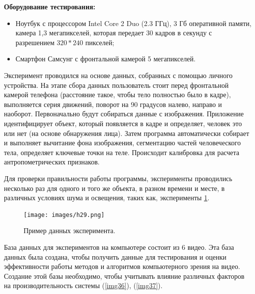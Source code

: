 \textbf{Оборудование тестирования:}

\begin{itemize}
	\item Ноутбук с процессором Intel Core 2 Duo (2.3 ГГц), 3 Гб оперативной памяти, камера 1,3 мегапикселей, которая передает 30 кадров в секунду с разрешением  $320 * 240$ пикселей;
	\item Смартфон Самсунг с фронтальной камерой 5 мегапикселей.

\end{itemize}
Эксперимент проводился на основе данных, собранных с помощью личного устройства. На этапе сбора данных пользователь стоит перед фронтальной камерой телефона (расстояние такое, чтобы тело полностью было в кадре), выполняется серия движений, поворот на 90 градусов налево, направо и наоборот. Первоначально будут собираться данные с изображения. Приложение идентифицирует объект, который появляется в кадре и определяет, человек это или нет (на основе обнаружения лица). Затем программа автоматически собирает и выполняет вычитание фона изображения, сегментацию частей человеческого тела, определяет ключевые точки на теле. Происходит калибровка для расчета антропометрических признаков.

Для проверки правильности работы программы, эксперименты проводились несколько раз для одного и того же объекта, в разном времени и месте, в различных условиях шума и освещения, таких как, эксперименты \ref{img29}.

\begin{figure}[ht!]
\centering
\texttt{[image: images/h29.png]}
\begin{center}
\caption{Пример данных эксперимента.} \label{img29}
\end{center}
\end{figure}

База данных для экспериментов на компьютере состоит из 6 видео. Эта база данных была создана, чтобы получить данные для тестирования и оценки эффективности работы методов и алгоритмов компьютерного зрения на видео. Создание этой базы необходимо, чтобы учитывать влияние различных факторов на производительность системы (\ref{img36}), (\ref{img37}).

